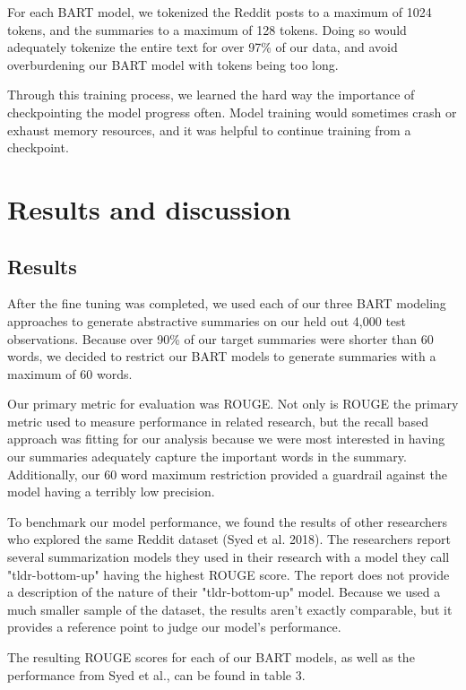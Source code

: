 \documentclass[11pt,a4paper, twocolumn]{article}
\begin{document}
For each BART model, we tokenized the Reddit posts to a maximum of 1024 tokens, and the summaries to a maximum of 128 tokens. 
Doing so would adequately tokenize the entire text for over 97\% of our data, and avoid overburdening our BART model with tokens being too long. 

Through this training process, we learned the hard way the importance of checkpointing the model progress often. 
Model training would sometimes crash or exhaust memory resources, and it was helpful to continue training from a checkpoint. 

\section{Results and discussion}

\subsection{Results}

After the fine tuning was completed, we used each of our three BART modeling approaches to generate abstractive summaries on 
our held out 4,000 test observations. Because over 90\% of our target summaries were shorter than 60 words, we decided to 
restrict our BART models to generate summaries with a maximum of 60 words. 

Our primary metric for evaluation was ROUGE. 
Not only is ROUGE the primary metric used to measure performance in related research, 
but the recall based approach was fitting for our analysis because we were most interested in having our summaries adequately capture the important words in the summary. 
Additionally, our 60 word maximum restriction provided a guardrail against the model having a terribly low precision.

To benchmark our model performance, we found the results of other researchers who explored the same Reddit dataset (Syed et al. 2018). 
The researchers report several summarization models they used in their research with a model they call "tldr-bottom-up" having the highest ROUGE score. 
The report does not provide a description of the nature of their "tldr-bottom-up" model. 
Because we used a much smaller sample of the dataset, the results aren't exactly comparable, 
but it provides a reference point to judge our model's performance. 

The resulting ROUGE scores for each of our BART models, as well as the performance from Syed et al., can be found in table 3.
\end{document}
